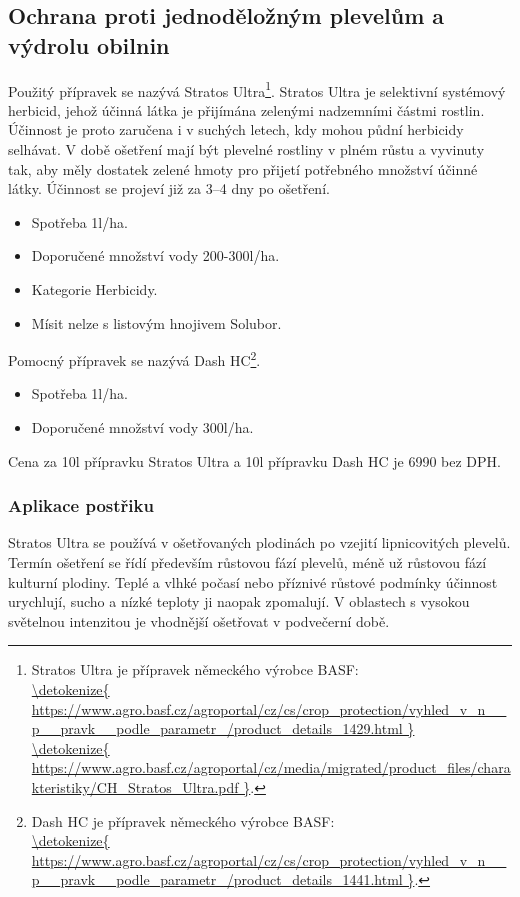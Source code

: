 \subsection{Ochrana proti jednoděložným plevelům a výdrolu obilnin}
Použitý přípravek se nazývá Stratos Ultra\footnote{Stratos Ultra je přípravek německého výrobce BASF: \\\url{\detokenize{
https://www.agro.basf.cz/agroportal/cz/cs/crop_protection/vyhled_v_n__p__pravk__podle_parametr_/product_details_1429.html
}}
\\\url{\detokenize{
https://www.agro.basf.cz/agroportal/cz/media/migrated/product_files/charakteristiky/CH_Stratos_Ultra.pdf
}}.}.
Stratos  Ultra  je  selektivní  systémový  herbicid,  jehož  účinná  látka  je  přijímána  
zelenými nadzemními částmi rostlin. Účinnost je proto zaručena i v suchých letech,  kdy  mohou  půdní  herbicidy  selhávat.  V  době  ošetření  mají  být  plevelné  
rostliny v plném růstu a vyvinuty tak, aby měly dostatek zelené hmoty pro přijetí 
potřebného množství účinné látky. Účinnost se projeví již za 3–4 dny po ošetření.
\begin{itemize}
  \item Spotřeba 1l/ha.
  \item Doporučené množství vody 200-300l/ha.
  \item Kategorie Herbicidy.
  \item Mísit nelze s listovým hnojivem Solubor.
\end{itemize}
Pomocný přípravek se nazývá Dash HC\footnote{Dash HC je přípravek německého výrobce BASF: \\\url{\detokenize{
https://www.agro.basf.cz/agroportal/cz/cs/crop_protection/vyhled_v_n__p__pravk__podle_parametr_/product_details_1441.html
}}.}.
\begin{itemize}
  \item Spotřeba 1l/ha.
  \item Doporučené množství vody 300l/ha.
\end{itemize}
Cena za 10l přípravku Stratos Ultra a 10l přípravku Dash HC je 6990 bez DPH.

\subsubsection{Aplikace postřiku}
Stratos Ultra se používá v ošetřovaných plodinách po vzejití lipnicovitých plevelů. Termín ošetření se řídí především růstovou fází plevelů, méně už růstovou fází 
kulturní plodiny. Teplé a vlhké počasí nebo příznivé růstové podmínky účinnost 
urychlují, sucho a nízké teploty ji naopak zpomalují. V oblastech s vysokou světelnou intenzitou je vhodnější ošetřovat v podvečerní době.


